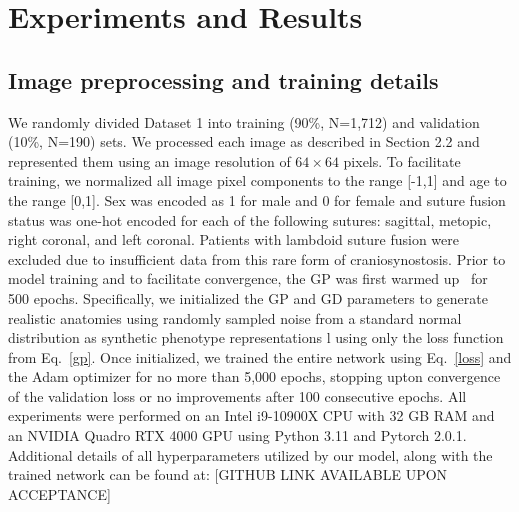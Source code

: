 \documentclass[conference]{IEEEtran}
\begin{document}
\section{Experiments and Results}
\subsection{Image preprocessing and training details}
We randomly divided Dataset 1 into training (90\%, N=1,712) and validation (10\%, N=190) sets. We processed each image as described in Section 2.2 and represented them using an image resolution of $64\times64$ pixels. To facilitate training, we normalized all image pixel components to the range [-1,1] and age to the range [0,1]. Sex was encoded as 1 for male and 0 for female and suture fusion status was one-hot encoded for each of the following sutures: sagittal, metopic, right coronal, and left coronal. Patients with lambdoid suture fusion were excluded due to insufficient data from this rare form of craniosynostosis.%
Prior to model training and to facilitate convergence, the GP was first warmed up~\cite{Grigoryev2022When} for 500 epochs. Specifically, we initialized the GP and GD parameters to generate realistic anatomies using randomly sampled noise from a standard normal distribution as synthetic phenotype representations l using only the loss function from Eq.~\ref{gp}. Once initialized, we trained the entire network using Eq.~\ref{loss} and the Adam optimizer for no more than 5,000 epochs, stopping upton convergence of the validation loss or no improvements after 100 consecutive epochs. All experiments were performed on an Intel i9-10900X CPU with 32 GB RAM and an NVIDIA Quadro RTX 4000 GPU using Python 3.11 and Pytorch 2.0.1. Additional details of all hyperparameters utilized by our model, along with the trained network can be found at: [GITHUB LINK AVAILABLE UPON ACCEPTANCE]
\end{document}
